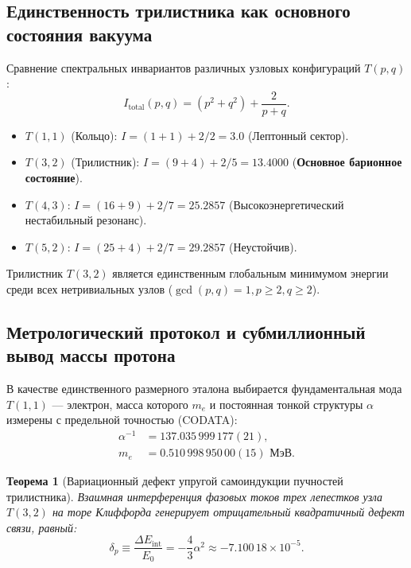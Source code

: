 \documentclass[12pt,a4paper]{article}
\newtheorem{theorem}{Теорема}
\begin{document}
	\subsection{Единственность трилистника как основного состояния вакуума}
	Сравнение спектральных инвариантов различных узловых конфигураций $T(p,q)$:
	\begin{equation}
		I_{\text{total}}(p,q) = (p^2 + q^2) + \frac{2}{p+q}.
	\end{equation}
	\begin{itemize}
		\item $T(1,1)$ (Кольцо): $I = (1+1) + 2/2 = 3.0$ (Лептонный сектор).
		\item $T(3,2)$ (Трилистник): $I = (9+4) + 2/5 = \mathbf{13.4000}$ (\textbf{Основное барионное состояние}).
		\item $T(4,3)$: $I = (16+9) + 2/7 = 25.2857$ (Высокоэнергетический нестабильный резонанс).
		\item $T(5,2)$: $I = (25+4) + 2/7 = 29.2857$ (Неустойчив).
	\end{itemize}
	Трилистник $T(3,2)$ является единственным глобальным минимумом энергии среди всех нетривиальных узлов ($\gcd(p,q)=1, p \ge 2, q \ge 2$).
	
	\subsection{Метрологический протокол и субмиллионный вывод массы протона}
	В качестве единственного размерного эталона выбирается фундаментальная мода $T(1,1)$ --- электрон, масса которого $m_e$ и постоянная тонкой структуры $\alpha$ измерены с предельной точностью (CODATA):
	\begin{align}
		\alpha^{-1} &= 137.035\,999\,177(21), \\
		m_e &= 0.510\,998\,950\,00(15) \text{ МэВ}.
	\end{align}
	
	\begin{theorem}[Вариационный дефект упругой самоиндукции пучностей трилистника]
		Взаимная интерференция фазовых токов трех лепестков узла $T(3,2)$ на торе Клиффорда генерирует отрицательный квадратичный дефект связи, равный:
		\begin{equation}
			\delta_p \equiv \frac{\Delta E_{\mathrm{int}}}{E_0} = -\frac{4}{3} \alpha^2 \approx -7.100\,18 \times 10^{-5}.
		\end{equation}
	\end{theorem}
	
\end{document}
